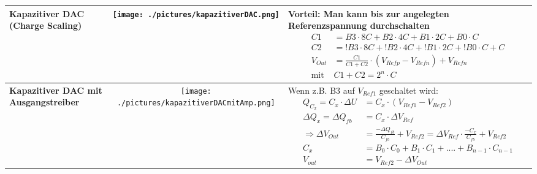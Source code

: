 \begin{longtable}{|p{3cm}|c|p{8.6cm}|}
	\\ \hline
	\textbf{Kapazitiver DAC (Charge Scaling)}
	& \texttt{[image: ./pictures/kapazitiverDAC.png]}
	& { {\bf Vorteil:} Man kann bis zur angelegten Referenzspannung durchschalten \newline
        \begin{align*}
		C1	&= B3 \cdot 8C+B2 \cdot 4C+ B1 \cdot 2C+B0 \cdot C \\
		C2	&= !B3 \cdot 8C+!B2 \cdot 4C+ !B1 \cdot 2C+!B0 \cdot C+C \\
		V_{Out}& =\frac{C1}{C1+C2}\cdot (V_{Refp}-V_{Refn}) + V_{Refn}\\
		\text{mit } & C1+C2=2^n\cdot C
	  \end{align*}}
	\\ \hline
    \textbf{Kapazitiver DAC mit Ausgangstreiber}
    & \texttt{[image: ./pictures/kapazitiverDACmitAmp.png]}
    & {Wenn z.B. B3 auf $V_{Ref1}$ geschaltet wird:\newline
      \begin{align*}
          Q_{C_x} = C_x \cdot \Delta U &= C_x \cdot (V_{Ref1}-V_{Ref2})\\
          \Delta Q_x = \Delta Q_{fb} &= C_x \cdot \Delta V_{Ref}\\
          \Rightarrow \Delta V_{Out} &= \frac{-\Delta Q_{fb}}{C_{fb}} + V_{Ref2} = \Delta V_{Ref} \cdot \frac{-C_x}{C_{fb}} + V_{Ref2} \\ 
          C_x &= B_0 \cdot C_0 + B_1 \cdot C_1 + .... + B_{n-1} \cdot C_{n-1}\\
          V_{out} &= V_{Ref2}-\Delta V_{Out}
      \end{align*}}
    \\ \hline
\end{longtable}


